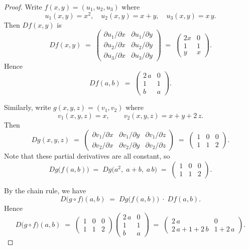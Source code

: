 \documentclass[11pt]{article}
\begin{document}
\begin{exercise}{1}
    \begin{proof}
Write $f(x,y)=(u_1,u_2,u_3)$ where 
\[
u_1(x,y)=x^2,\quad 
u_2(x,y)=x+y,\quad
u_3(x,y)=x\,y.
\]
Then $Df(x,y)$ is 
\[
Df(x,y)
\;=\;
\begin{pmatrix}
\partial u_1/\partial x & \partial u_1/\partial y\\
\partial u_2/\partial x & \partial u_2/\partial y\\
\partial u_3/\partial x & \partial u_3/\partial y
\end{pmatrix}
\;=\;
\begin{pmatrix}
2x & 0\\[6pt]
1 & 1\\[6pt]
y & x
\end{pmatrix}.
\]
Hence
\[
Df(a,b)
\;=\;
\begin{pmatrix}
2\,a & 0\\[4pt]
1 & 1\\[4pt]
b & a
\end{pmatrix}.
\]

\bigskip
\noindent
Similarly, write $g(x,y,z) = (v_1,v_2)$ where
\[
v_1(x,y,z)=x,\qquad 
v_2(x,y,z)=x+y+2\,z.
\]
Then
\[
Dg(x,y,z)
\;=\;
\begin{pmatrix}
\partial v_1/\partial x & \partial v_1/\partial y & \partial v_1/\partial z\\
\partial v_2/\partial x & \partial v_2/\partial y & \partial v_2/\partial z
\end{pmatrix}
\;=\;
\begin{pmatrix}
1 & 0 & 0\\[4pt]
1 & 1 & 2
\end{pmatrix}.
\]
Note that these partial derivatives are all constant, so 
\[
Dg\bigl(f(a,b)\bigr)
\;=\;
Dg\bigl(a^2,\;a+b,\;a\,b\bigr)
\;=\;
\begin{pmatrix}
1 & 0 & 0\\[4pt]
1 & 1 & 2
\end{pmatrix}.
\]

By the chain rule, we have
\[
D\bigl(g\circ f\bigr)(a,b)
\;=\;
Dg\bigl(f(a,b)\bigr)\;\cdot\;Df(a,b).
\]
Hence
\[
D\bigl(g\circ f\bigr)(a,b)
\;=\;
\begin{pmatrix}
1 & 0 & 0\\[4pt]
1 & 1 & 2
\end{pmatrix}
\begin{pmatrix}
2\,a & 0\\[4pt]
1 & 1\\[4pt]
b & a
\end{pmatrix}
\;=\;
\begin{pmatrix}
2\,a & 0\\[6pt]
2\,a + 1 + 2\,b & 1 + 2\,a
\end{pmatrix}.
\]
    \end{proof}
\end{exercise}
\end{document}
